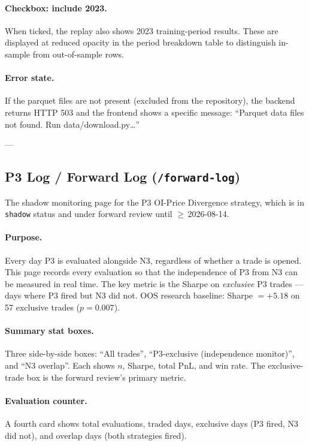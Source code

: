 \documentclass[12pt, a4paper]{article}
\begin{document}
\paragraph{Checkbox: include 2023.}
When ticked, the replay also shows 2023 training-period results. These are
displayed at reduced opacity in the period breakdown table to distinguish
in-sample from out-of-sample rows.

\paragraph{Error state.}
If the parquet files are not present (excluded from the repository),
the backend returns HTTP 503 and the frontend shows a specific message:
``Parquet data files not found. Run data/download.py\ldots''

---

\subsection{P3 Log / Forward Log (\texttt{/forward-log})}

The shadow monitoring page for the P3 OI-Price Divergence strategy, which
is in \texttt{shadow} status and under forward review until $\geq$\,2026-08-14.

\paragraph{Purpose.}
Every day P3 is evaluated alongside N3, regardless of whether a trade is
opened. This page records every evaluation so that the independence of P3
from N3 can be measured in real time. The key metric is the Sharpe on
\emph{exclusive} P3 trades --- days where P3 fired but N3 did not.
OOS research baseline: Sharpe $= +5.18$ on 57 exclusive trades ($p = 0.007$).

\paragraph{Summary stat boxes.}
Three side-by-side boxes: ``All trades'', ``P3-exclusive (independence
monitor)'', and ``N3 overlap''. Each shows $n$, Sharpe, total PnL, and win
rate. The exclusive-trade box is the forward review's primary metric.

\paragraph{Evaluation counter.}
A fourth card shows total evaluations, traded days, exclusive days (P3
fired, N3 did not), and overlap days (both strategies fired).
\end{document}
